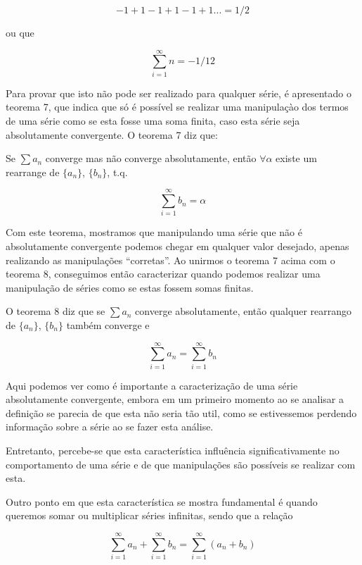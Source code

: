 \documentclass[a4paper, 12pt]{article}
\begin{document}
\begin{equation}
 \nonumber -1 + 1 -1 + 1 - 1 + 1 ... = 1/2
\end{equation}

ou que 

\begin{equation}
 \nonumber \sum_{i=1}^\infty n = -1/12
\end{equation}

Para provar que isto não pode ser realizado para qualquer série, é apresentado o teorema 7,
que indica que só é possível se realizar uma manipulaçào dos termos de uma série como se esta
fosse uma soma finita, caso esta série seja absolutamente convergente. O teorema 7 diz que:

Se $\sum a_n$ converge mas não converge absolutamente, então $\forall \alpha$ existe um rearrange
de $\{a_n\}$, $\{b_n\}$, t.q.

\begin{equation}
 \nonumber \sum_{i=1}^\infty b_n = \alpha
\end{equation}

Com este teorema, mostramos que manipulando uma série que não é absolutamente convergente
podemos chegar em qualquer valor desejado, apenas realizando as manipulações ``corretas''. 
Ao unirmos o teorema 7 acima com o teorema 8, conseguimos então caracterizar quando podemos 
realizar uma manipulação de séries como se estas fossem somas finitas.

O teorema 8 diz que se $\sum a_n$ converge absolutamente, então qualquer rearrango
de $\{a_n\}$, $\{b_n\}$ também converge e 

\begin{equation}
 \nonumber \sum_{i=1}^\infty a_n = \sum_{i=1}^\infty b_n 
\end{equation}

Aqui podemos ver como é importante a caracterização de uma série absolutamente convergente,
embora em um primeiro momento ao se analisar a definição se parecia de que esta não seria tão util,
como se estivessemos perdendo informação sobre a série ao se fazer esta análise.

Entretanto, percebe-se que esta característica influência significativamente no comportamento de uma série
e de que manipulações são possíveis se realizar com esta.

Outro ponto em que esta característica se mostra fundamental é quando queremos somar ou multiplicar
séries infinitas, sendo que a relação

\begin{equation}
 \nonumber \sum_{i=1}^\infty a_n + \sum_{i=1}^\infty b_n  = \sum_{i=1}^\infty (a_n + b_n)  
\end{equation}
\end{document}
